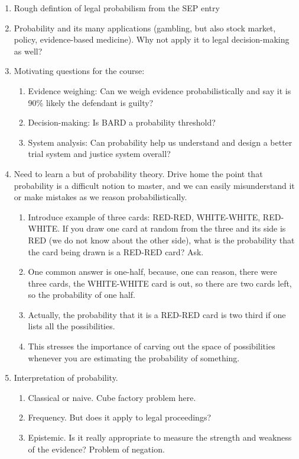 \documentclass[16pt]{article}
\begin{document}
\begin{enumerate}
\item Rough defintion of legal probabilism from the SEP entry
\item Probability and its many applications (gambling, but also stock market, policy, evidence-based medicine). 
Why not apply it to legal decision-making as well?
\item Motivating questions for the course: 
\begin{enumerate}
\item Evidence weighing: Can we weigh evidence probabilistically and say it is 90\% likely the defendant is guilty?
\item Decision-making: Is BARD a probability threshold?
\item System analysis: Can probability help us understand and design a better trial system and justice system overall?
\end{enumerate}
\item Need to learn a but of probability theory. Drive home the point that probability is a difficult notion to 
master, and we can easily misunderstand it or make mistakes as we reason probabilistically.
\begin{enumerate}
\item  Introduce example of three cards: RED-RED, WHITE-WHITE, RED-WHITE. If you draw one card at random from the three and its side is RED (we do not know about the other side), what is the probability that the card being drawn is a RED-RED card? Ask. 
\item One common answer is one-half, because, one can reason, there were three cards, the WHITE-WHITE card is out, so there are two cards left, so the probability of one half. 
\item Actually, the probability that it is a RED-RED card is two third if one lists all the possibilities. 
\item This stresses the importance of carving out the space of possibilities whenever you are estimating the probability of something.
\end{enumerate}
%
\item Interpretation of probability.
\begin{enumerate}
\item Classical or naive. Cube factory problem here.
\item Frequency. But does it apply to legal proceedings?
\item Epistemic. Is it really appropriate to measure the strength and weakness of the evidence? Problem of negation.

\end{enumerate}
\end{enumerate}
\end{document}
